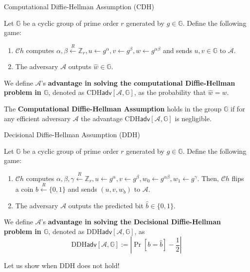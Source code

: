 \documentclass{beamer}
\begin{document}
    \begin{frame}{Computational Diffie-Hellman Assumption (CDH)}
        \begin{definition}
            Let $\mathbb{G}$ be a cyclic group of prime order $r$ generated by $g \in \mathbb{G}$. Define the following game:
            \begin{enumerate}
                \item $\mathcal{C}h$ computes $\alpha, \beta \xleftarrow{R} \mathbb{Z}_r, u \gets g^{\alpha}, v \gets g^{\beta}, w \gets g^{\alpha\beta}$ and sends $u,v \in \mathbb{G}$ to $\mathcal{A}$.
                \item The adversary $\mathcal{A}$ outputs $\hat{w} \in \mathbb{G}$.
            \end{enumerate}
        
            We define $\mathcal{A}$'s \textbf{advantage in solving the computational Diffie-Hellman problem in $\mathbb{G}$}, denoted as $\text{CDH}\mathsf{adv}[\mathcal{A},\mathbb{G}]$, as the probability that $\hat{w} = w$.
        \end{definition}
        
        \begin{definition}
            The \textbf{Computational Diffie-Hellman Assumption} holds in the group $\mathbb{G}$ if for any efficient adversary $\mathcal{A}$ the advantage $\text{CDH}\mathsf{adv}[\mathcal{A},\mathbb{G}]$ is negligible.
        \end{definition}
    \end{frame}

    \begin{frame}{Decisional Diffie-Hellman Assumption (DDH)}
        \begin{definition}
            Let $\mathbb{G}$ be a cyclic group of prime order $r$ generated by $g \in \mathbb{G}$. Define the following game:
            \begin{enumerate}
                \item $\mathcal{C}h$ computes $\alpha, \beta,\gamma \xleftarrow{R} \mathbb{Z}_r, u \gets g^{\alpha}, v \gets g^{\beta}, w_0 \gets g^{\alpha\beta}, w_1 \gets g^{\gamma}$. Then, $\mathcal{C}h$ flips a coin $b \xleftarrow{R} \{0,1\}$ and sends $(u,v,w_b)$ to $\mathcal{A}$.
                \item The adversary $\mathcal{A}$ outputs the predicted bit $\hat{b} \in \{0,1\}$.
            \end{enumerate}
        
            We define $\mathcal{A}$'s \textbf{advantage in solving the Decisional Diffie-Hellman problem in $\mathbb{G}$}, denoted as $\text{DDH}\mathsf{adv}[\mathcal{A},\mathbb{G}]$, as
            \begin{equation*}
                \text{DDH}\mathsf{adv}[\mathcal{A},\mathbb{G}] := \left| \Pr[b = \hat{b}] - \frac{1}{2} \right|
            \end{equation*}
        \end{definition}

        Let us show when DDH does not hold!
    \end{frame}
\end{document}
